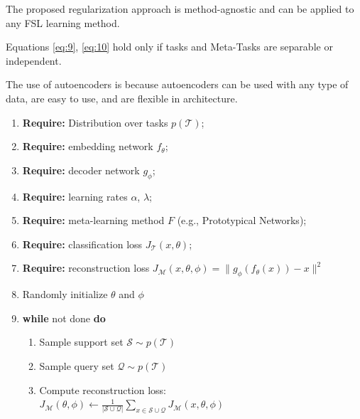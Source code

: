 \begin{remark}{The proposed regularization approach is method-agnostic and can be applied to any FSL learning method.} \end{remark}
\begin{remark}{Equations \eqref{eq:9}, \eqref{eq:10} hold only if tasks and Meta-Tasks are separable or independent.}
\end{remark}
\begin{remark}{The use of autoencoders is because autoencoders can be used with any type of data, are easy to use, and are flexible in architecture.}
\end{remark}

\begin{algorithm}[t]
  \caption{Meta-Tasks: Task-Decoder}
  \label{alg:task_decoder}
  \begin{enumerate}
      \item \textbf{Require:} Distribution over tasks $p(\mathcal{T})$; \\
      \item \textbf{Require:} embedding network $f_{\theta}$; \\
      \item \textbf{Require:} decoder network $g_{\phi}$; \\
      \item \textbf{Require:} learning rates $\alpha$, $\lambda$; 
      \item \textbf{Require:} meta-learning method $F$ (e.g., Prototypical Networks); 
      \item \textbf{Require:} classification loss $J_{\mathcal{T}}(x, \theta)$;
      \item \textbf{Require:} reconstruction loss $J_{\mathcal{M}}(x, \theta, \phi) = \| g_{\phi}(f_{\theta}(x)) - x \|^2$ \\
      \item Randomly initialize $\theta$ and $\phi$
      \item \textbf{while} not done \textbf{do}
      \begin{enumerate}
          \item Sample support set $\mathcal{S} \sim p(\mathcal{T})$
          \item Sample query set $\mathcal{Q} \sim p(\mathcal{T})$
          \item Compute reconstruction loss: \\
          $J_{\mathcal{M}}(\theta, \phi) \leftarrow \frac{1}{|\mathcal{S} \cup \mathcal{Q}|} \sum_{x \in \mathcal{S} \cup \mathcal{Q}} J_{\mathcal{M}}(x, \theta, \phi)$

\end{enumerate}
\end{enumerate}
\end{algorithm}
